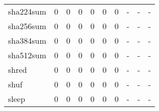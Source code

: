 \begin{longtable}{lp{1.3cm}p{1.3cm}p{1.3cm}p{1.3cm}p{1.3cm}p{1.3cm}p{1.3cm}p{1.3cm}p{1.3cm}}
sha224sum &                      0 &                                             0 &                                            0 &                                           0 &                                            0 &                                          0 &                                    - &                                      - &                                    - \\
sha256sum &                      0 &                                             0 &                                            0 &                                           0 &                                            0 &                                          0 &                                    - &                                      - &                                    - \\
sha384sum &                      0 &                                             0 &                                            0 &                                           0 &                                            0 &                                          0 &                                    - &                                      - &                                    - \\
sha512sum &                      0 &                                             0 &                                            0 &                                           0 &                                            0 &                                          0 &                                    - &                                      - &                                    - \\
shred     &                      0 &                                             0 &                                            0 &                                           0 &                                            0 &                                          0 &                                    - &                                      - &                                    - \\
shuf      &                      0 &                                             0 &                                            0 &                                           0 &                                            0 &                                          0 &                                    - &                                      - &                                    - \\
sleep     &                      0 &                                             0 &                                            0 &                                           0 &                                            0 &                                          0 &                                    - &                                      - &                                    - \\

\end{longtable}
